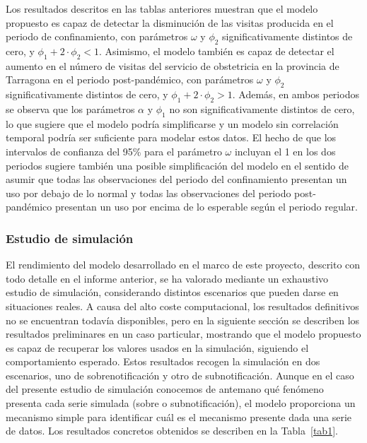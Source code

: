 \documentclass[12pt,twoside]{article} %
\begin{document}
Los resultados descritos en las tablas anteriores muestran que el modelo propuesto es capaz de detectar la disminución de las visitas producida en el periodo de confinamiento, con parámetros $\omega$ y $\phi_2$ significativamente distintos de cero, y $\phi_1 + 2 \cdot \phi_2 < 1$. Asimismo, el modelo también es capaz de detectar el aumento en el número de visitas del servicio de obstetricia en la provincia de Tarragona en el periodo post-pandémico, con parámetros $\omega$ y $\phi_2$ significativamente distintos de cero, y $\phi_1 + 2 \cdot \phi_2 > 1$. Además, en ambos periodos se observa que los parámetros $\alpha$ y $\phi_1$ no son significativamente distintos de cero, lo que sugiere que el modelo podría simplificarse y un modelo sin correlación temporal podría ser suficiente para modelar estos datos. El hecho de que los intervalos de confianza del 95\% para el parámetro $\omega$ incluyan el 1 en los dos periodos sugiere también una posible simplificación del modelo en el sentido de asumir que todas las observaciones del periodo del confinamiento presentan un uso por debajo de lo normal y todas las observaciones del periodo post-pandémico presentan un uso por encima de lo esperable según el periodo regular. 

\subsubsection{Estudio de simulación}
El rendimiento del modelo desarrollado en el marco de este proyecto, descrito con todo detalle en el informe anterior, se ha valorado mediante un exhaustivo estudio de simulación, considerando distintos escenarios que pueden darse en situaciones reales. A causa del alto coste computacional, los resultados definitivos no se encuentran todavía disponibles, pero en la siguiente sección se describen los resultados preliminares en un caso particular, mostrando que el modelo propuesto es capaz de recuperar los valores usados en la simulación, siguiendo el comportamiento esperado. Estos resultados recogen la simulación en dos escenarios, uno de sobrenotificación y otro de subnotificación. Aunque en el caso del presente estudio de simulación conocemos de antemano qué fenómeno presenta cada serie simulada (sobre o subnotificación), el modelo proporciona un mecanismo simple para identificar cuál es el mecanismo presente dada una serie de datos. Los resultados concretos obtenidos se describen en la Tabla~\ref{tab1}.
\end{document}

